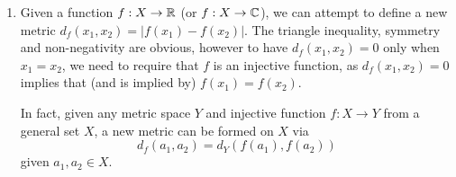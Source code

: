 \begin{enumerate}
    \item Given a function $f : X \to \mathbb{R}$ (or $f: X \to \mathbb{C}$), we can attempt to define a new metric \mbox{$d_{f}(x_{1},x_{2}) = |f(x_{1}) - f(x_{2})|$}. The triangle inequality, symmetry and non-negativity are obvious, however to have \mbox{$d_{f}(x_{1},x_{2})=0$} only when $x_{1} = x_{2}$, we need to require that $f$ is an injective function, as \mbox{$d_{f}(x_{1},x_{2})=0$} implies that (and is implied by) \mbox{$f(x_{1}) = f(x_{2})$}.
    
        In fact, given any metric space $Y$ and injective function $f : X \to Y$ from a general set $X$, a new metric can be formed on $X$ via \[ d_{f}(a_{1},a_{2}) = d_{Y}(f(a_{1}), f(a_{2})) \] given $a_{1},a_{2} \in X$.
\end{enumerate}
